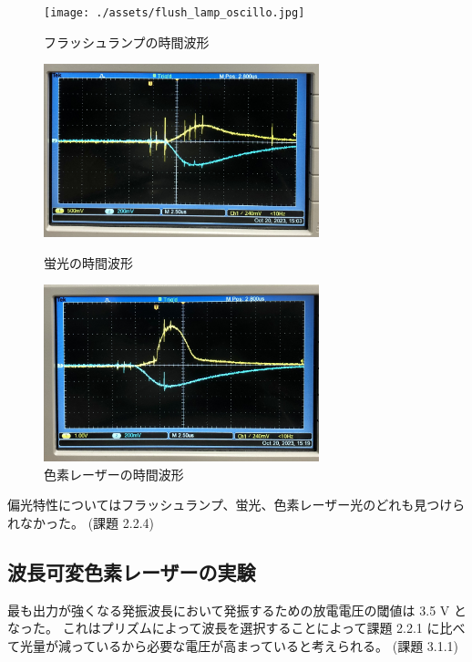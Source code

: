 \documentclass[uplatex,dvipdfmx,a4paper,11pt]{jlreq}
\numberwithin{equation}{section}
\theoremstyle{definition}
\begin{document}
\begin{figure}[htbp]
  \centering
  \texttt{[image: ./assets/flush\_lamp\_oscillo.jpg]}
  \caption{フラッシュランプの時間波形}
  \label{flush lamp oscillo}
\end{figure}
\begin{figure}[htbp]
  \begin{minipage}[b]{0.5\linewidth}
    \centering
    \includegraphics[width=8cm]{./assets/fluorescence_oscillo.jpg}
    \caption{蛍光の時間波形}
    \label{fluorescene oscillo}
  \end{minipage}
  \begin{minipage}[b]{0.5\linewidth}
    \centering
    \includegraphics[width=8cm]{./assets/dye_laser_oscillo.jpg}
    \caption{色素レーザーの時間波形}
    \label{dye laser oscillo}
  \end{minipage}
\end{figure}

偏光特性についてはフラッシュランプ、蛍光、色素レーザー光のどれも見つけられなかった。
(課題 2.2.4) \\

\subsection{波長可変色素レーザーの実験}

最も出力が強くなる発振波長において発振するための放電電圧の閾値は 3.5 \si{V} となった。
これはプリズムによって波長を選択することによって課題 2.2.1 に比べて光量が減っているから必要な電圧が高まっていると考えられる。
(課題 3.1.1) \\
\end{document}
